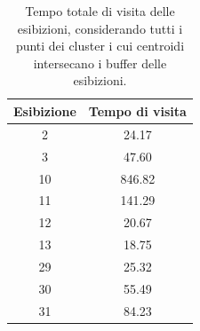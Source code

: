 \documentclass[12pt]{article}
\begin{document}
    \begin{table}[!ht]
        \centering
        \begin{tabular}{|c|c|}
        \hline
        \textbf{Esibizione} & \textbf{Tempo di visita} \\ \hline
        2                   & 24.17                    \\ \hline
        3                   & 47.60                    \\ \hline
        10                  & 846.82                   \\ \hline
        11                  & 141.29                   \\ \hline
        12                  & 20.67                    \\ \hline
        13                  & 18.75                    \\ \hline
        29                  & 25.32                    \\ \hline
        30                  & 55.49                    \\ \hline
        31                  & 84.23                    \\ \hline
        \end{tabular}
        \caption{Tempo totale di visita delle esibizioni, considerando tutti i punti dei cluster i cui centroidi intersecano i buffer delle esibizioni.}
        \label{exhibits_time_visiting_cluster}
    \end{table}
\end{document}
